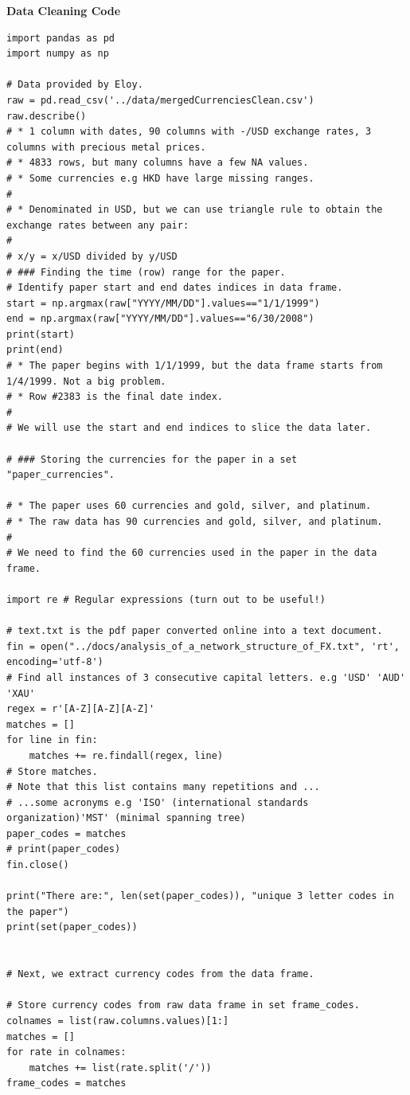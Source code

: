 \documentclass[a4paper]{article}
\begin{document}
\textbf{Data Cleaning Code}
\begin{lstlisting}
import pandas as pd
import numpy as np

# Data provided by Eloy.
raw = pd.read_csv('../data/mergedCurrenciesClean.csv')
raw.describe()
# * 1 column with dates, 90 columns with -/USD exchange rates, 3 columns with precious metal prices.
# * 4833 rows, but many columns have a few NA values.
# * Some currencies e.g HKD have large missing ranges.
#
# * Denominated in USD, but we can use triangle rule to obtain the exchange rates between any pair:
#
# x/y = x/USD divided by y/USD
# ### Finding the time (row) range for the paper.
# Identify paper start and end dates indices in data frame.
start = np.argmax(raw["YYYY/MM/DD"].values=="1/1/1999")
end = np.argmax(raw["YYYY/MM/DD"].values=="6/30/2008")
print(start)
print(end)
# * The paper begins with 1/1/1999, but the data frame starts from 1/4/1999. Not a big problem.
# * Row #2383 is the final date index.
#
# We will use the start and end indices to slice the data later.

# ### Storing the currencies for the paper in a set "paper_currencies".

# * The paper uses 60 currencies and gold, silver, and platinum.
# * The raw data has 90 currencies and gold, silver, and platinum.
#
# We need to find the 60 currencies used in the paper in the data frame.

import re # Regular expressions (turn out to be useful!)

# text.txt is the pdf paper converted online into a text document.
fin = open("../docs/analysis_of_a_network_structure_of_FX.txt", 'rt', encoding='utf-8')
# Find all instances of 3 consecutive capital letters. e.g 'USD' 'AUD' 'XAU'
regex = r'[A-Z][A-Z][A-Z]'
matches = []
for line in fin:
    matches += re.findall(regex, line)
# Store matches.
# Note that this list contains many repetitions and ...
# ...some acronyms e.g 'ISO' (international standards organization)'MST' (minimal spanning tree)
paper_codes = matches
# print(paper_codes)
fin.close()

print("There are:", len(set(paper_codes)), "unique 3 letter codes in the paper")
print(set(paper_codes))


# Next, we extract currency codes from the data frame.

# Store currency codes from raw data frame in set frame_codes.
colnames = list(raw.columns.values)[1:]
matches = []
for rate in colnames:
    matches += list(rate.split('/'))
frame_codes = matches


\end{lstlisting}
\end{document}
